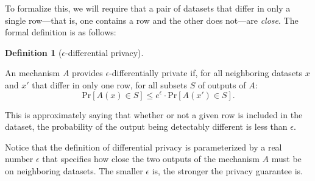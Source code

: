 \documentclass[
  letterpaper,
]{scrbook}
\theoremstyle{definition}
\newtheorem{definition}{Definition}[chapter]
\theoremstyle{plain}
\theoremstyle{plain}
\theoremstyle{remark}
\begin{document}
To formalize this, we will require that a pair of datasets that differ
in only a single row---that is, one contains a row and the other does
not---are \emph{close}. The formal definition is as follows:


\begin{definition}[\(\epsilon\)-differential
privacy]\protect\hypertarget{def-dp}{}\label{def-dp}

An mechanism \(A\) provides \(\epsilon\)-differentially private if, for
all neighboring datasets \(x\) and \(x'\) that differ in only one row,
for all subsets \(S\) of outputs of \(A\):
\[ \text{Pr}[A(x) \in S] \leq e^\epsilon \cdot \text{Pr}[A(x') \in S]. \]


This is approximately saying that whether or not a given row is included
in the dataset, the probability of the output being detectably different
is less than \(\epsilon\).

\end{definition}


Notice that the definition of differential privacy is parameterized by a
real number \(\epsilon\) that specifies how close the two outputs of the
mechanism \(A\) must be on neighboring datasets. The smaller
\(\epsilon\) is, the stronger the privacy guarantee is.

\end{document}
